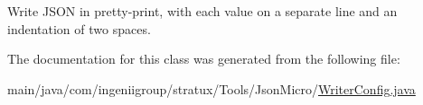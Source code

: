 Write J\+S\+ON in pretty-\/print, with each value on a separate line and an indentation of two spaces. 

The documentation for this class was generated from the following file\+:\begin{DoxyCompactItemize}
\item 
main/java/com/ingeniigroup/stratux/\+Tools/\+Json\+Micro/\hyperlink{_writer_config_8java}{Writer\+Config.\+java}\end{DoxyCompactItemize}

